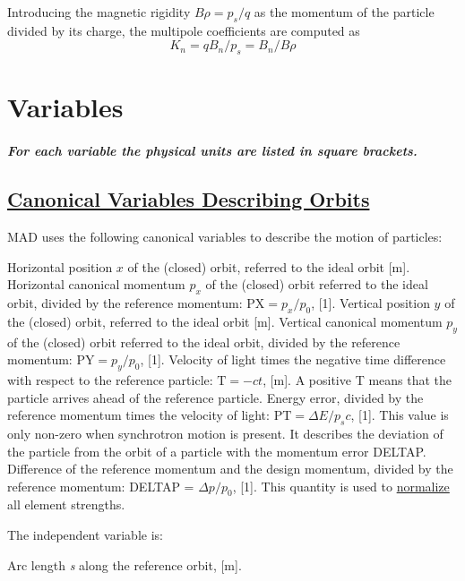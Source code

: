 Introducing the magnetic rigidity \(B \rho = p_s / q\) as the
momentum of the particle divided by its charge, the multipole
coefficients are computed as
\[ K_n = q B_n / p_s  =  B_n / B \rho \] 



\section{Variables}
\label{sec:variables}
\subparagraph{ For each variable the physical units are listed in square brackets. }

\subsection{\href{canon}{Canonical Variables Describing Orbits}} 
\label{subsec:tables_canon}
MAD uses the following canonical variables to describe the motion of particles: 
\begin{madlist}
    Horizontal position $x$ of the (closed) orbit,
     referred to the ideal orbit [m].    
    Horizontal canonical momentum $p_x$ of the
     (closed) orbit referred to the ideal orbit, divided by the
     reference momentum: $\textrm{PX} = p_x / p_0$, [1].   
    Vertical position $y$ of the (closed) orbit, referred
     to the ideal orbit [m].   
    Vertical canonical momentum $p_y$ of the (closed)
     orbit referred to the ideal orbit, divided by the reference
     momentum: $\textrm{PY} = p_y / p_0$, [1].   
    Velocity of light times the negative time difference with
     respect to the reference particle: $\textrm{T} =  - c t$, [m]. A
     positive T means that the particle arrives ahead of the reference
     particle.   
    Energy error, divided by the reference momentum times the
     velocity of light: $\textrm{PT} = \Delta E / p_s c$, [1]. 
     This value is only non-zero when synchrotron motion is
     present. It describes the deviation of the particle from the orbit
     of a particle with the momentum error DELTAP.   
    Difference of the reference momentum and the design
     momentum, divided by the reference momentum: DELTAP =
     $\Delta p / p_0$, [1]. This quantity is used to
     \href{defects.html}{normalize} all element strengths.   
\end{madlist} 

The independent variable is: 
\begin{madlist}
    Arc length \textit{s} along the reference orbit, [m].   
\end{madlist} 

